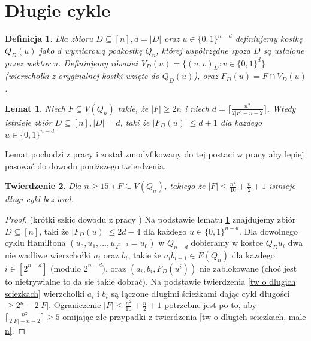 \documentclass{pracamgr}
\newtheorem{defi}{Definicja}[section] %
\newtheorem{theorem}{Twierdzenie}
\newtheorem{lemma}[theorem]{Lemat}
\begin{document}
  \section{Długie cykle}
   \begin{defi}\label{przekrój kostki}
    Dla zbioru $D\subseteq[n], d=|D|$ oraz $u\in\{0,1\}^{n-d}$ definiujemy kostkę $Q_D(u)$ jako $d$ wymiarową podkostkę $Q_n$, której współrzędne spoza $D$
    są ustalone przez wektor $u$. Definiujemy również $V_D(u)=\{(u,v)_D:v\in\{0,1\}^d\}$ (wierzchołki z oryginalnej kostki wzięte do $Q_D(u)$), oraz
    $F_D(u)=F\cap V_D(u)$.
   \end{defi}
   \begin{lemma}\label{dlugi cykl - podzial kostki}
    Niech $F\subseteq V(Q_n)$ takie, że $|F|\ge 2n$ i niech $d=\lceil\frac{n^2}{2|F|-n-2}\rceil$.
    Wtedy istnieje zbiór $D\subseteq[n],|D|=d$, taki że $|F_D(u)|\le d+1$ dla kazdego $u\in\{0,1\}^{n-d}$
   \end{lemma}
   Lemat pochodzi z pracy \cite{Wie} i został zmodyfikowany do tej postaci w pracy \cite{FG} aby lepiej pasować do dowodu poniższego twierdzenia.
   \begin{theorem}\label{dlugi cykl - tw}
    Dla $n\ge15$ i $F\subseteq V(Q_n)$, takiego że $|F|\le\frac{n^2}{10}+\frac{n}{2}+1$ istnieje długi cykl bez wad.
   \end{theorem}
   \begin{proof}
    (krótki szkic dowodu z pracy \cite{FG})\newline
    Na podstawie lematu \ref{dlugi cykl - podzial kostki} znajdujemy zbiór $D\subseteq[n]$, taki że $|F_D(u)|\le 2d-4$ dla każdego $u\in\{0,1\}^{n-d}$.
    Dla dowolnego cyklu Hamiltona $(u_0,u_1,...,u_{2^{n-d}}=u_0)$ w $Q_{n-d}$ dobieramy w kostce $Q_D{u_i}$ dwa nie wadliwe
    wierzchołki $a_i$ oraz $b_i$, takie że $a_ib_{i+1}\in E(Q_n)$ dla kazdego $i\in[2^{n-d}]$ (modulo $2^{n-d}$),
    oraz $(a_i,b_i,F_D(u^i))$ nie zablokowane (choć jest to nietrywialne to da sie takie dobrać).
    Na podstawie twierdzenia \ref{tw o dlugich sciezkach} wierzchołki $a_i$ i $b_i$ są łączone długimi ścieżkami dając cykl długości $\ge 2^n-2|F|$.
    Ograniczenie $|F|\le\frac{n^2}{10}+\frac{n}{2}+1$ potrzebne jest po to, aby $\lceil\frac{n^2}{2|F|-n-2}\rceil\ge5$ omijając złe przypadki z twierdzenia
    \ref{tw o dlugich sciezkach, male n}.
   \end{proof}
\end{document}
